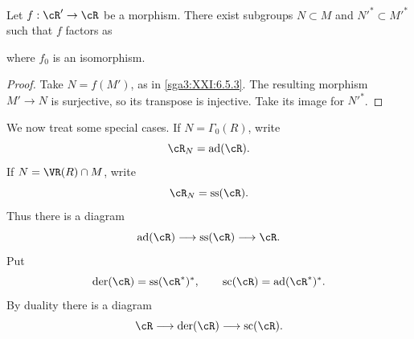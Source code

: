 \begin{lemma}\label{sga3:XXI:6.5.4}
Let \(f:\cR'\to\cR\) be a morphism. There exist subgroups
\(N\subset M\) and \(N'^\ast\subset M'^\ast\) such that \(f\) factors
as
\begin{center}
\end{center}
where \(f_0\) is an isomorphism.
\end{lemma}

\begin{proof}
Take \(N=f(M')\), as in \ref{sga3:XXI:6.5.3}. The resulting morphism
\(M'\to N\) is surjective, so its transpose is injective. Take its
image for \(N'^\ast\).
\end{proof}


We now treat some special cases. If \(N=\Gamma_0(R)\), write
\[
 \cR_N=\operatorname{ad}(\cR).
\]
If \(N=\VR(R)\cap M\), write
\[
 \cR_N=\operatorname{ss}(\cR).
\]
Thus there is a diagram
\[
 \operatorname{ad}(\cR)\longrightarrow
 \operatorname{ss}(\cR)\longrightarrow\cR.
\]
Put
\[
 \operatorname{der}(\cR)=\operatorname{ss}(\cR^\ast)^\ast,
 \qquad
 \operatorname{sc}(\cR)=\operatorname{ad}(\cR^\ast)^\ast.
\]
By duality there is a diagram
\[
 \cR\longrightarrow
 \operatorname{der}(\cR)\longrightarrow
 \operatorname{sc}(\cR).
\]

